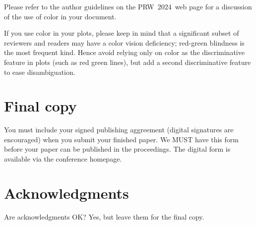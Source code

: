 \documentclass[10pt,twocolumn,letterpaper]{article}
\def\confName{PRW}
\def\confYear{2024}
\begin{document}
Please refer to the author guidelines on the \confName\ \confYear\ web page for a discussion of the use of color in your document.

If you use color in your plots, please keep in mind that a significant subset of reviewers and readers may have a color vision deficiency; red-green blindness is the most frequent kind. Hence avoid relying only on color as the discriminative feature in plots (such as red \vs green lines), but add a second discriminative feature to ease disambiguation. 


\section{Final copy}

You must include your signed publishing aggreement (digital signatures are encouraged) when you submit your finished paper. We MUST have this form before your paper can be published in the proceedings. The digital form is available via the conference homepage. 


\section*{Acknowledgments}

Are acknowledgments OK?  Yes, but leave them for the final copy.

{\small


}
\end{document}
